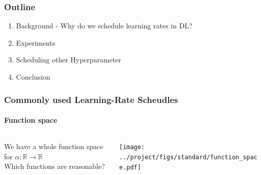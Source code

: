 \documentclass[10pt,aspectratio=169]{beamer}
\begin{document}
    \begin{darkframe}
        \frametitle{Outline}
        
        \begin{enumerate}
            \item Background - Why do we schedule learning rates in DL?
            \item Experiments
            \item Scheduling other Hyperparameter
            \item Conclusion
        \end{enumerate}
    \end{darkframe}


    \begin{frame}
        \frametitle{Commonly used Learning-Rate Scheudles}   
        \framesubtitle{Function space}     
        \begin{columns}
            \begin{column}{0.5\textwidth}
                We have a whole function space for $\alpha: \mathbb{R} \to \mathbb{R}$\\
                Which functions are reasonable?
            \end{column}
            \begin{column}{0.5\textwidth}
                \texttt{[image: ../project/figs/standard/function\_space.pdf]}
            \end{column}
        \end{columns}
        
    
    \end{frame}
\end{document}
